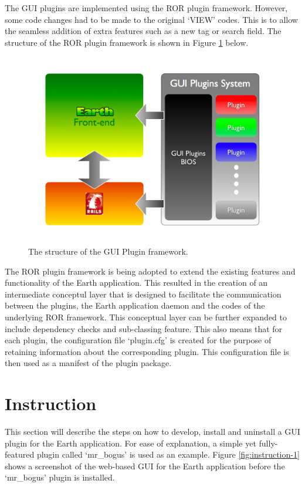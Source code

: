 \documentclass{article}
\begin{document}
The GUI plugins are implemented using the ROR plugin framework. However, some code changes had to be made to the original `VIEW' codes. This is to allow the seamless addition of extra features such as a new tag or search field. The structure of the ROR plugin framework is shown in Figure \ref{fig:flow} below.

\begin{figure}[ht]
    \centering
    \includegraphics[scale=0.4]{fig/flow.png}
    \caption{The structure of the GUI Plugin framework.}
    \label{fig:flow}
\end{figure}

The ROR plugin framework is being adopted to extend the existing features and functionality of the Earth application. This resulted in the creation of an intermediate conceptul layer that is designed to facilitate the communication between the plugins, the Earth application daemon and the codes of the underlying ROR framework. This conceptual layer can be further expanded to include dependency checks and sub-classing feature. This also means that for each plugin, the configuration file `plugin.cfg' is created for the purpose of retaining information about the corresponding plugin. This configuration file is then used as a manifest of the plugin package.


\section{Instruction} %

This section will describe the steps on how to develop, install and uninstall a GUI plugin for the Earth application. For ease of explanation, a simple yet fully-featured plugin called `mr\_bogus' is used as an example. Figure \ref{fig:instruction-1} shows a screenshot of the web-based GUI for the Earth application before the `mr\_bogus' plugin is installed.
\end{document}
